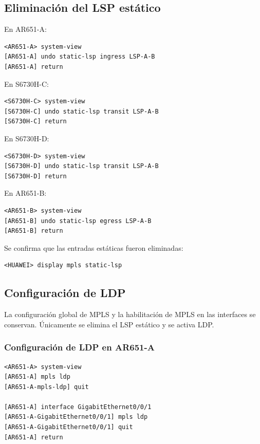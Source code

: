 \subsection{Eliminación del LSP estático}

En AR651-A:

\begin{lstlisting}[style=terminal]
<AR651-A> system-view
[AR651-A] undo static-lsp ingress LSP-A-B
[AR651-A] return
\end{lstlisting}

En S6730H-C:

\begin{lstlisting}[style=terminal]
<S6730H-C> system-view
[S6730H-C] undo static-lsp transit LSP-A-B
[S6730H-C] return
\end{lstlisting}

En S6730H-D:

\begin{lstlisting}[style=terminal]
<S6730H-D> system-view
[S6730H-D] undo static-lsp transit LSP-A-B
[S6730H-D] return
\end{lstlisting}

En AR651-B:

\begin{lstlisting}[style=terminal]
<AR651-B> system-view
[AR651-B] undo static-lsp egress LSP-A-B
[AR651-B] return
\end{lstlisting}

Se confirma que las entradas estáticas fueron eliminadas:

\begin{lstlisting}[style=terminal]
<HUAWEI> display mpls static-lsp
\end{lstlisting}

\subsection{Configuración de LDP}

La configuración global de MPLS y la habilitación de MPLS en las interfaces
se conservan. Únicamente se elimina el LSP estático y se activa LDP.

\subsubsection{Configuración de LDP en AR651-A}

\begin{lstlisting}[style=terminal]
<AR651-A> system-view
[AR651-A] mpls ldp
[AR651-A-mpls-ldp] quit

[AR651-A] interface GigabitEthernet0/0/1
[AR651-A-GigabitEthernet0/0/1] mpls ldp
[AR651-A-GigabitEthernet0/0/1] quit
[AR651-A] return
\end{lstlisting}

